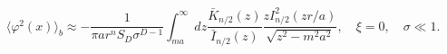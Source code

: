 \begin{equation}\label{phi2sigll1b}
\langle \varphi ^{2}(x)\rangle _{b}\approx -\frac{1}{\pi a
r^nS_D\sigma ^{D-1}}\int _{ma}^{\infty }dz \frac{\bar
K_{n/2}(z)}{\bar
I_{n/2}(z)}\frac{zI^2_{n/2}(zr/a)}{\sqrt{z^2-m^2a^2}},\quad \xi
=0,\quad \sigma \ll 1.
\end{equation}

